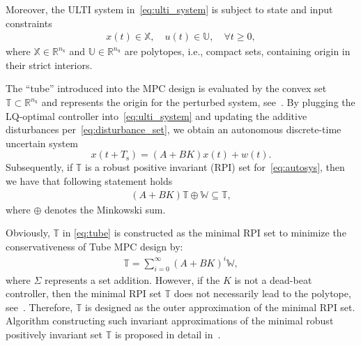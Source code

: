 \documentclass[letterpaper, 10 pt, conference]{ieeeconf}
\begin{document}
Moreover, the ULTI system in~\eqref{eq:ulti_system} is subject to state and input constraints
\begin{eqnarray}
	\label{eq:constraints_x_u}
	x(t) \in \mathbb{X}, \quad u(t) \in \mathbb{U}, \quad \forall t \geq 0,
\end{eqnarray}
where $\mathbb{X} \in \mathbb{R}^{n_{\mathrm{x}}}$ and $\mathbb{U} \in \mathbb{R}^{n_{\mathrm{u}}}$ are polytopes, i.e., compact sets, containing origin in their strict interiors. 

The ``tube'' introduced into the MPC design is evaluated by the convex set $\mathbb{T} \subset \mathbb{R}^{n_{\mathrm{x}}}$ and represents the origin for the perturbed system, see~\cite{MS05}. 
%
By plugging the LQ-optimal controller into~\eqref{eq:ulti_system} and updating the additive disturbances per~\eqref{eq:disturbance_set}, we obtain an autonomous discrete-time uncertain system 
\begin{equation}
	\label{eq:autosys}
	x(t+T_{\mathrm{s}}) = (A + BK)x(t) + w(t).
\end{equation}
Subsequently, if $\mathbb{T}$ is a robust positive invariant (RPI) set for~\eqref{eq:autosys}, then we have that following statement holds 
\begin{eqnarray}
	\label{eq:tube}
	\left( A + B K \right) \mathbb{T} \oplus \mathbb{W} \subseteq \mathbb{T},
\end{eqnarray}
where $\oplus$ denotes the Minkowski sum.

Obviously, $\mathbb{T}$ in \eqref{eq:tube} is constructed as the minimal RPI set to minimize the conservativeness of Tube MPC design by:
\begin{eqnarray}
	\label{eq:tube_design}
	\mathbb{T} = \sum_{i=0}^{\infty} \left( A + B K \right)^{i} \mathbb{W},
\end{eqnarray}
where $\Sigma$ represents a set addition. However, if the $K$ is not a dead-beat controller, then the minimal RPI set $\mathbb{T}$ does not necessarily lead to the polytope, see~\cite{MS05}. Therefore, $\mathbb{T}$ is designed as the outer approximation of the minimal RPI set.  Algorithm constructing such invariant approximations of the minimal robust positively invariant set $\mathbb{T}$ is proposed in detail in~\cite{RK05}.
\end{document}
